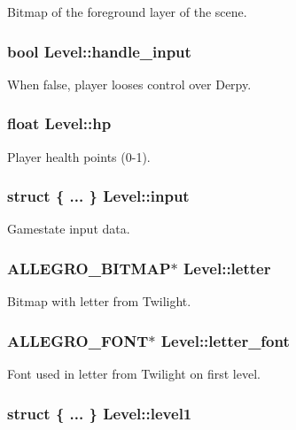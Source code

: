 Bitmap of the foreground layer of the scene. \hypertarget{structLevel_a06cf4f2da517284d2006540051d3e5c0}{
\subsubsection[{handle\-\_\-input}]{\setlength{\rightskip}{0pt plus 5cm}bool Level\-::handle\-\_\-input}}\label{structLevel_a06cf4f2da517284d2006540051d3e5c0}
When false, player looses control over Derpy. \hypertarget{structLevel_a49df009e8113251cfcb48fe17df0b571}{
\subsubsection[{hp}]{\setlength{\rightskip}{0pt plus 5cm}float Level\-::hp}}\label{structLevel_a49df009e8113251cfcb48fe17df0b571}
Player health points (0-\/1). \hypertarget{structLevel_a238f3f47a5598d7150c6bba03b4f6dda}{
\subsubsection[{input}]{\setlength{\rightskip}{0pt plus 5cm}struct \{ ... \}   Level\-::input}}\label{structLevel_a238f3f47a5598d7150c6bba03b4f6dda}
Gamestate input data. \hypertarget{structLevel_af1b1699478b4633d76c01ea09e666df4}{
\subsubsection[{letter}]{\setlength{\rightskip}{0pt plus 5cm}A\-L\-L\-E\-G\-R\-O\-\_\-\-B\-I\-T\-M\-A\-P$\ast$ Level\-::letter}}\label{structLevel_af1b1699478b4633d76c01ea09e666df4}
Bitmap with letter from Twilight. \hypertarget{structLevel_a69e6eae14648fd488a1dec0f55e4d293}{
\subsubsection[{letter\-\_\-font}]{\setlength{\rightskip}{0pt plus 5cm}A\-L\-L\-E\-G\-R\-O\-\_\-\-F\-O\-N\-T$\ast$ Level\-::letter\-\_\-font}}\label{structLevel_a69e6eae14648fd488a1dec0f55e4d293}
Font used in letter from Twilight on first level. \hypertarget{structLevel_af1fca124d2e1de4cca501af83c1fce87}{
\subsubsection[{level1}]{\setlength{\rightskip}{0pt plus 5cm}struct \{ ... \}   Level\-::level1}}\label{structLevel_af1fca124d2e1de4cca501af83c1fce87}
